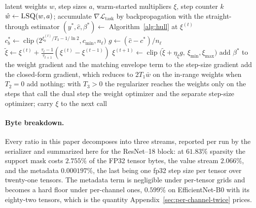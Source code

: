 \documentclass{article}
\begin{document}
\begin{algorithm}[H]
\caption{One PRESTO optimizer step. The regularizer enters the same backward pass
as the task loss, so weights, step sizes and symbol distribution move together.}
\label{alg:metaq}
\begin{algorithmic}[1]
\Require latent weights $w$, step sizes $a$, warm-started multipliers $\xi$,
step counter $k$
\State $\hat w\gets\textsc{LSQ}(w,a)$; accumulate $\nabla\mathcal L_{\mathrm{task}}$
       by backpropagation with the straight-through estimator
   
    \State $(y^*,\widehat c,\beta^*)\gets$ Algorithm~\ref{alg:hull} at $\xi^{(t)}$
    \State $c^*_b\gets\operatorname{clip}\bigl(2^{\xi^{(t)}_b/T_3-1/\ln2},
           c_{\min},n_\ell\bigr)$ 
    \State $g\gets(\widehat c-c^*)/n_\ell$
    \State $\widetilde\xi\gets\xi^{(t)}+\frac{\tau_t-1}{\tau_{t+1}}(\xi^{(t)}-\xi^{(t-1)})$
    \State $\xi^{(t+1)}\gets\operatorname{clip}\bigl(\widetilde\xi+\eta_\xi g,\
           \xi_{\min},\xi_{\max}\bigr)$
  \EndFor
  \State add $\beta^*$ to the weight gradient and the matching envelope term to
         the step-size gradient \Comment{Appendix~\ref{app:total-grad}}
\ElsIf{$T_3=0$}
  \State add the closed-form gradient, which reduces to $2T_1\bar w$ on the
         in-range weights when $T_2=0$
\Else
  \State add nothing: with $T_3>0$ the regularizer reaches the weights only on
         the steps that call the dual 
\EndIf
\State step the weight optimizer and the separate step-size optimizer; carry
       $\xi$ to the next call
\end{algorithmic}
\end{algorithm}

\paragraph{Byte breakdown.} Every ratio in this paper decomposes into three
streams, reported per run by the serializer and summarized here for the
ResNet--18 block: at $61.83\%$ sparsity the support mask costs $2.755\%$ of the
FP32 tensor bytes, the value stream $2.066\%$, and the metadata $0.000197\%$,
the last being one fp32 step size per tensor over twenty-one tensors. The
metadata term is negligible under per-tensor grids and becomes a hard floor
under per-channel ones, $0.599\%$ on EfficientNet-B0 with its eighty-two
tensors, which is the quantity Appendix~\ref{sec:per-channel-twice} prices.
\end{document}
